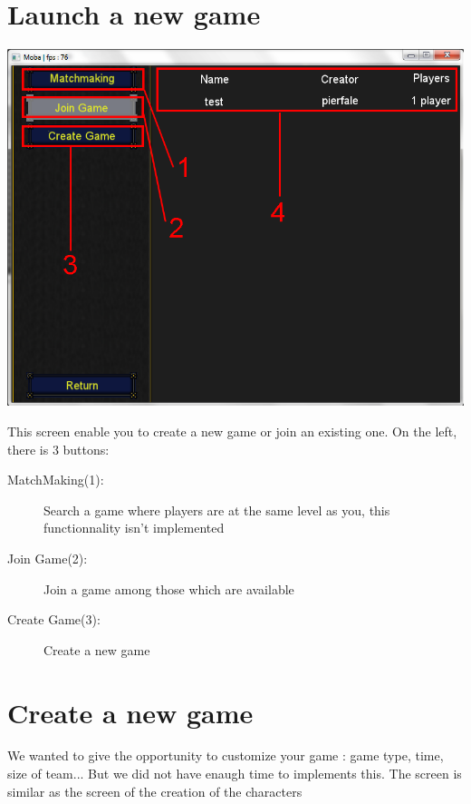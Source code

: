 \documentclass{scrreprt}
\begin{document}
		  \section{Launch a new game}
		  \begin{center}
		  \includegraphics[scale=0.4]{launch_screen.png}
		  \end{center}
		  This screen enable you to create a new game or join an existing one. On the left, there is 3 buttons:
		  \begin{description}
		  \item[MatchMaking(1):]{Search a game where players are at the same level as you, this functionnality isn't implemented}
		  \item[Join Game(2):]{Join a game among those which are available}
		  \item[Create Game(3):]{Create a new game}
		  \end{description}
		  \section{Create a new game}
		  We wanted to give the opportunity to customize your game : game type, time, size of team... But we did not have enaugh time to implements this. The screen is similar as the screen of the creation of the characters %
\end{document}
